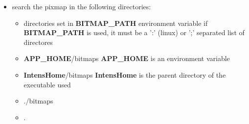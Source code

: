 \begin{itemize}
\item search the pixmap in the following directories:
  \begin{itemize}
  \item directories set in {\bfseries BITMAP\_PATH} environment variable \newline
        if {\bfseries BITMAP\_PATH} is used, it must be
        a ':' (linux) or ';' separated list of directores
  \item {\bfseries APP\_HOME}/bitmaps \newline
        {\bfseries APP\_HOME} is an environment variable
  \item {\bfseries IntensHome}/bitmaps \newline
        {\bfseries IntensHome} is the parent directory of the \INTENS{} executable used
  \item ./bitmaps
  \item .
  \end{itemize}

\end{itemize}
